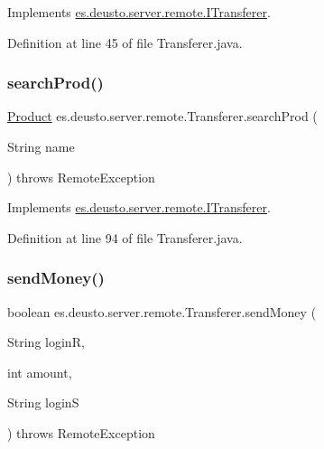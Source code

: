 Implements \hyperlink{interfacees_1_1deusto_1_1server_1_1remote_1_1_i_transferer_ab805207e578865de5bf2e69ca8942344}{es.\+deusto.\+server.\+remote.\+I\+Transferer}.



Definition at line 45 of file Transferer.\+java.

\mbox{\label{classes_1_1deusto_1_1server_1_1remote_1_1_transferer_ad6759f696eddd682b750f92ec41d1fcb}} 
\subsubsection{\texorpdfstring{search\+Prod()}{searchProd()}}
{\footnotesize\ttfamily \hyperlink{classes_1_1deusto_1_1server_1_1db_1_1data_1_1_product}{Product} es.\+deusto.\+server.\+remote.\+Transferer.\+search\+Prod (\begin{DoxyParamCaption}\item[{String}]{name }\end{DoxyParamCaption}) throws Remote\+Exception}



Implements \hyperlink{interfacees_1_1deusto_1_1server_1_1remote_1_1_i_transferer_a1fb33a5447e1647ffde8a01d180b8d99}{es.\+deusto.\+server.\+remote.\+I\+Transferer}.



Definition at line 94 of file Transferer.\+java.

\mbox{\label{classes_1_1deusto_1_1server_1_1remote_1_1_transferer_ad1eb84155ba0c457645f2ad53725320d}} 
\subsubsection{\texorpdfstring{send\+Money()}{sendMoney()}}
{\footnotesize\ttfamily boolean es.\+deusto.\+server.\+remote.\+Transferer.\+send\+Money (\begin{DoxyParamCaption}\item[{String}]{loginR,  }\item[{int}]{amount,  }\item[{String}]{loginS }\end{DoxyParamCaption}) throws Remote\+Exception}



